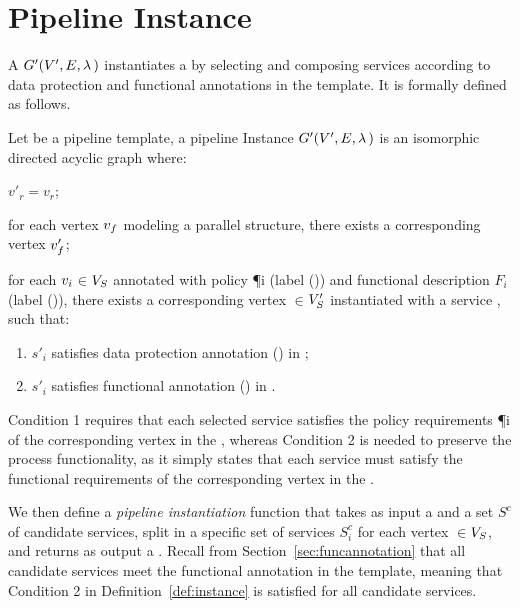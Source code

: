 \section{Pipeline Instance}\label{sec:instance}
A \pipelineInstance $G'(V',E,\lambda\,)$ instantiates a \pipelineTemplate \tChartFunction by selecting and composing services according to data protection and functional annotations in the template. It is formally defined as follows.

\begin{definition}\label{def:instance}
  Let \tChartFunction be a pipeline template, a pipeline Instance $G'(V',E,\lambda\,)$ is an isomorphic directed acyclic graph where:
  \begin{enumerate*}[label=\textit{\roman*})]
    \item $v'_r$$=$$v_r$;
    \item for each vertex $v_{f}$ modeling a parallel structure, there exists a corresponding vertex $v'_{f}$;
    \item for each $v_{i}$$\in$$V_S$ annotated with policy \P{i} (label \myLambda()) and functional description $F_i$ (label \myGamma()), there exists a corresponding vertex $\in$$V'_S$ instantiated with a service , such that:
  \end{enumerate*}
  \begin{enumerate}[label=\arabic*)]
    \item $s'_i$ satisfies data protection annotation \myLambda() in \tChartFunction;
    \item $s'_i$ satisfies functional annotation \myGamma() in \tChartFunction.
  \end{enumerate}
\end{definition}

Condition 1 requires that each selected service  satisfies the policy requirements \P{i} of the corresponding vertex  in the \pipelineTemplate, whereas Condition 2 is needed to preserve the process functionality, as it simply states that each service  must satisfy the functional requirements  of the corresponding vertex  in the \pipelineTemplate.

We then define a \emph{pipeline instantiation} function that takes as input a \pipelineTemplate \tChartFunction and a set $S^c$ of candidate services, split in a specific set of services $S^c_{i}$ for each vertex $\in$$V_S$, and returns as output a \pipelineInstance \iChartFunction. Recall from Section~\ref{sec:funcannotation} that all candidate services meet the functional annotation in the template, meaning that Condition 2 in Definition~\ref{def:instance} is satisfied for all candidate services.

